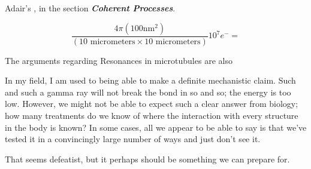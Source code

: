 \documentclass[paper.tex]{subfiles}
\begin{document}
Adair's \cite{Vibrational2002}, in the section {\it \bf Coherent Processes}. 

$$\frac{4 \pi (100 \text{nm}^2)}{(10 \text{ micrometers} \times 10 \text{ micrometers})} 10^7 e^- = $$

The arguments regarding Resonances in microtubules are also 




In my field, I am used to being able to make a definite mechanistic claim. Such and such a gamma ray will not break the bond in so and so; the energy is too low. However, we might not be able to expect such a clear answer from biology; how many treatments do we know of where the interaction with every structure in the body is known? In some cases, all we appear to be able to say is that we've tested it in a convincingly large number of ways and just don't see it.

That seems defeatist, but it perhaps should be something we can prepare for.


\cite{Identification2018}
\end{document}
